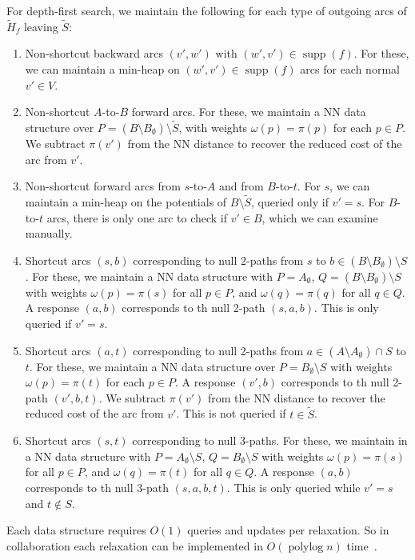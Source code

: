 \documentclass[a4paper,UKenglish]{socg-lipics-v2018}
\def\polylog{\mathop{\mathrm{polylog}}}
\def\supp{\operatorname{supp}}
\theoremstyle{plain}
\numberwithin{figure}{section}
\begin{document}
\begin{toappendix}

For depth-first search, we maintain the following for each type of outgoing arcs of $\tilde{H}_f$ leaving $\tilde{S}$:
%
\begin{enumerate}
\item Non-shortcut backward arcs $(v', w')$ with $(w', v') \in \supp(f)$.
	For these, we can maintain a min-heap on $(w', v') \in \supp(f)$ arcs
	for each normal $v' \in V$.
\item Non-shortcut $A$-to-$B$ forward arcs.
	For these, we maintain a NN data structure over
	$P = (B \setminus B_\emptyset) \setminus \tilde{S}$, with weights
	$\omega(p) = \pi(p)$ for each $p \in P$.
	We subtract $\pi(v')$ from the NN distance to recover the reduced cost
	of the arc from $v'$.
\item Non-shortcut forward arcs from $s$-to-$A$ and from $B$-to-$t$.
	For $s$, we can maintain a min-heap on the potentials of
	$B \setminus \tilde{S}$, queried only if $v' = s$.
	For $B$-to-$t$ arcs, there is only one arc to check if $v' \in B$,
	which we can examine manually.

\item Shortcut arcs $(s, b)$ corresponding to null 2-paths from $s$ to
	$b \in (B \setminus B_\emptyset) \setminus S$.
	For these, we maintain a NN data structure with $P = A_\emptyset$,
	$Q = (B \setminus B_\emptyset) \setminus S$ with weights
	$\omega(p) = \pi(s)$ for all $p \in P$, and $\omega(q) = \pi(q)$ for
	all $q \in Q$.
	A response $(a, b)$ corresponds to th null 2-path $(s, a, b)$.
	This is only queried if $v' = s$.
\item Shortcut arcs $(a, t)$ corresponding to null 2-paths from
	$a \in (A \setminus A_\emptyset) \cap S$ to $t$.
	For these, we maintain a NN data structure over
	$P = B_\emptyset \setminus S$ with weights $\omega(p) = \pi(t)$ for
	each $p \in P$.
	A response $(v', b)$ corresponds to th null 2-path $(v', b, t)$.
	We subtract $\pi(v')$ from the NN distance to recover the reduced cost
	of the arc from $v'$.
	This is not queried if $t \in \tilde{S}$.
\item Shortcut arcs $(s, t)$ corresponding to null 3-paths.
	For these, we maintain in a NN data structure with
	$P = A_\emptyset \setminus S$, $Q = B_\emptyset \setminus S$ with
	weights $\omega(p) = \pi(s)$ for all
	$p \in P$, and $\omega(q) = \pi(t)$ for all $q \in Q$.
	A response $(a, b)$ corresponds to th null 3-path $(s, a, b, t)$.
	This is only queried while $v' = s$ and $t \not\in S$.
\end{enumerate}

\end{toappendix}
%
Each data structure requires $O(1)$ queries and updates per relaxation.
So in collaboration each relaxation can be implemented in $O(\polylog n)$ time~\cite{KMRSS17}.
\end{document}
